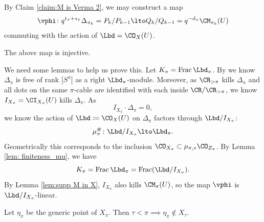 \documentclass[11pt,reqno]{amsart}
\begin{document}
By Claim \ref{claim:M is Verma 2}, we may construct a map
\[\vphi\colon q^{t_\pi+s_\pi}\Delta_{\pi_k}=P_k/P_{k-1}\lto Q_k/Q_{k-1}=q^{-d_\alpha}\CM_{\pi_k}(U)\]
commuting with the action of $\Lbd=\CO_X(U)$. 
\begin{proposition}\label{prop:avatars of verma inject}
    The above map is injective.
\end{proposition}
We need some lemmas to help us prove this. Let $K_\pi=\Frac\Lbd_\pi$. By \cite{kleshchev2013affine} we know $\Delta_\pi$ is free of rank $|S^\pi|$ as a right $\Lbd_\pi$-module. Moreover, as $\CR_{>\pi}$ kills $\Delta_\pi$ and all dots on the same $\pi$-cable are identified with each inside $\CR/\CR_{>\pi}$, we know $I_{X_\pi}=\CI_{X_\pi}(U)$ kills $\Delta_\pi$. As 
\[I_{X_\pi}\cdot\Delta_\pi=0,\]
we know the action of $\Lbd\coloneqq \CO_X(U)$ on $\Delta_\pi$ factors through $\Lbd/I_{X_\pi}$:
\[\mu_\pi^\# \colon \Lbd/I_{X_\pi}\lto \Lbd_\pi.\] 
Geometrically this corresponds to the inclusion $\CO_{X_\pi}\subset \mu_{\pi,*} \CO_{Z_\pi}$. By Lemma \ref{lem: finiteness_mu}, we have
\[K_\pi=\Frac\Lbd_\pi=\Frac(\Lbd/I_{X_\pi}).\]
By Lemma \ref{lem:supp M in X}, $I_{X_\pi}$ also kills $\CM_{\pi}(U)$, so the map $\vphi$ is $\Lbd/I_{X_\pi}$-linear. 
\begin{lemma}\label{lem:generic points of strata}
    Let $\eta_\pi$ be the generic point of $X_\pi$. Then $\tau<\pi\implies \eta_\pi\not\in X_\tau$. 
\end{lemma}
\end{document}
